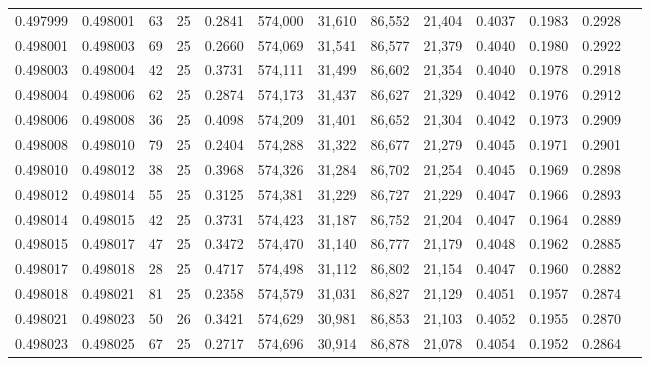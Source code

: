 \begin{tabular}{rrrrrrrrrrrrr}
0.497999 & 0.498001 &    63 &  25 &                                     0.2841 & 574,000 &  31,610 &  86,552 &  21,404 & 0.4037 & 0.1983 & 0.2928 \\
0.498001 & 0.498003 &    69 &  25 &                                     0.2660 & 574,069 &  31,541 &  86,577 &  21,379 & 0.4040 & 0.1980 & 0.2922 \\
0.498003 & 0.498004 &    42 &  25 &                                     0.3731 & 574,111 &  31,499 &  86,602 &  21,354 & 0.4040 & 0.1978 & 0.2918 \\
0.498004 & 0.498006 &    62 &  25 &                                     0.2874 & 574,173 &  31,437 &  86,627 &  21,329 & 0.4042 & 0.1976 & 0.2912 \\
0.498006 & 0.498008 &    36 &  25 &                                     0.4098 & 574,209 &  31,401 &  86,652 &  21,304 & 0.4042 & 0.1973 & 0.2909 \\
0.498008 & 0.498010 &    79 &  25 &                                     0.2404 & 574,288 &  31,322 &  86,677 &  21,279 & 0.4045 & 0.1971 & 0.2901 \\
0.498010 & 0.498012 &    38 &  25 &                                     0.3968 & 574,326 &  31,284 &  86,702 &  21,254 & 0.4045 & 0.1969 & 0.2898 \\
0.498012 & 0.498014 &    55 &  25 &                                     0.3125 & 574,381 &  31,229 &  86,727 &  21,229 & 0.4047 & 0.1966 & 0.2893 \\
0.498014 & 0.498015 &    42 &  25 &                                     0.3731 & 574,423 &  31,187 &  86,752 &  21,204 & 0.4047 & 0.1964 & 0.2889 \\
0.498015 & 0.498017 &    47 &  25 &                                     0.3472 & 574,470 &  31,140 &  86,777 &  21,179 & 0.4048 & 0.1962 & 0.2885 \\
0.498017 & 0.498018 &    28 &  25 &                                     0.4717 & 574,498 &  31,112 &  86,802 &  21,154 & 0.4047 & 0.1960 & 0.2882 \\
0.498018 & 0.498021 &    81 &  25 &                                     0.2358 & 574,579 &  31,031 &  86,827 &  21,129 & 0.4051 & 0.1957 & 0.2874 \\
0.498021 & 0.498023 &    50 &  26 &                                     0.3421 & 574,629 &  30,981 &  86,853 &  21,103 & 0.4052 & 0.1955 & 0.2870 \\
0.498023 & 0.498025 &    67 &  25 &                                     0.2717 & 574,696 &  30,914 &  86,878 &  21,078 & 0.4054 & 0.1952 & 0.2864 \\

\end{tabular}
